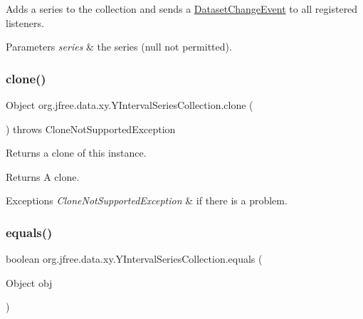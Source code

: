 Adds a series to the collection and sends a \mbox{\hyperlink{}{Dataset\+Change\+Event}} to all registered listeners.


\begin{DoxyParams}{Parameters}
{\em series} & the series ({\ttfamily null} not permitted). \\
\hline
\end{DoxyParams}
\mbox{\label{classorg_1_1jfree_1_1data_1_1xy_1_1_y_interval_series_collection_a27e024439abf77df545317b718f80217}} 
\subsubsection{\texorpdfstring{clone()}{clone()}}
{\footnotesize\ttfamily Object org.\+jfree.\+data.\+xy.\+Y\+Interval\+Series\+Collection.\+clone (\begin{DoxyParamCaption}{ }\end{DoxyParamCaption}) throws Clone\+Not\+Supported\+Exception}

Returns a clone of this instance.

\begin{DoxyReturn}{Returns}
A clone.
\end{DoxyReturn}

\begin{DoxyExceptions}{Exceptions}
{\em Clone\+Not\+Supported\+Exception} & if there is a problem. \\
\hline
\end{DoxyExceptions}
\mbox{\label{classorg_1_1jfree_1_1data_1_1xy_1_1_y_interval_series_collection_a22ddec9c72d3546f9b84e9b16068af8b}} 
\subsubsection{\texorpdfstring{equals()}{equals()}}
{\footnotesize\ttfamily boolean org.\+jfree.\+data.\+xy.\+Y\+Interval\+Series\+Collection.\+equals (\begin{DoxyParamCaption}\item[{Object}]{obj }\end{DoxyParamCaption})}


